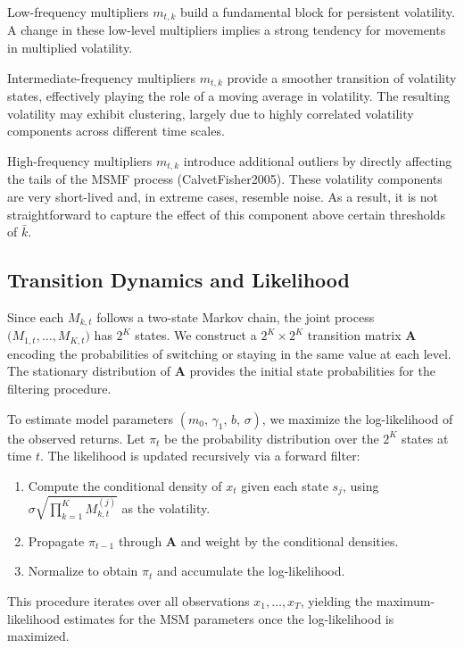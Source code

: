 \documentclass[11pt]{extarticle}
\begin{document}
\FloatBarrier

Low-frequency multipliers $m_{t,k}$ build a fundamental block for persistent volatility.
A change in these low-level multipliers implies a strong tendency for movements in multiplied volatility.

Intermediate-frequency multipliers $m_{t,k}$ provide a smoother transition of volatility states,
effectively playing the role of a moving average in volatility. The resulting volatility may exhibit
clustering, largely due to highly correlated volatility components across different time scales.


High-frequency multipliers $m_{t,k}$ introduce additional outliers by directly affecting the
tails of the MSMF process (CalvetFisher2005). These volatility components are very short-lived and,
in extreme cases, resemble noise. As a result, it is not straightforward to capture the effect of this
component above certain thresholds of $\bar{k}$.

\subsection{Transition Dynamics and Likelihood}
Since each $M_{k,t}$ follows a two-state Markov chain, the joint process $\bigl(M_{1,t}, \dots, M_{K,t}\bigr)$ has $2^K$ states. We construct a $2^K \times 2^K$ transition matrix $\mathbf{A}$ encoding the probabilities of switching or staying in the same value at each level. The stationary distribution of $\mathbf{A}$ provides the initial state probabilities for the filtering procedure.

To estimate model parameters $(m_0,\,\gamma_1,\,b,\,\sigma)$, we maximize the log-likelihood of the observed returns. Let $\pi_t$ be the probability distribution over the $2^K$ states at time $t$. The likelihood is updated recursively via a forward filter:
\begin{enumerate}
    \item Compute the conditional density of $x_t$ given each state $s_j$,
          using $\sigma \sqrt{\prod_{k=1}^K M_{k,t}^{(j)}}$ as the volatility.
    \item Propagate $\pi_{t-1}$ through $\mathbf{A}$ and weight by the conditional densities.
    \item Normalize to obtain $\pi_t$ and accumulate the log-likelihood.
\end{enumerate}
This procedure iterates over all observations $x_1,\ldots,x_T$, yielding the maximum-likelihood estimates for the MSM parameters once the log-likelihood is maximized.
\end{document}
